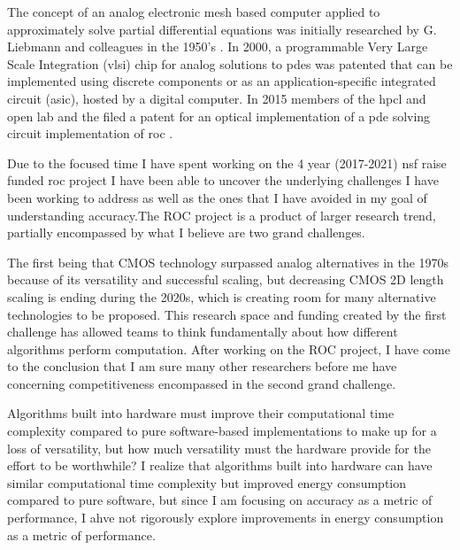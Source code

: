 \par The concept of an analog electronic mesh based computer applied to approximately solve partial differential equations was initially researched by G. Liebmann and colleagues in the 1950's \cite{G.Liebmann_1950, liebmann1954resistance}. In 2000, a programmable \gls{Very Large Scale Integration} (\acrshort{vlsi}) chip for analog solutions to \acrshort{pde}s was patented \cite{ramirez2000digitally} that can be implemented using discrete components or as an \gls{application-specific integrated circuit} (\acrshort{asic}), hosted by a digital computer. In 2015 members of the \acrfull{hpcl} and \acrfull{open} lab and the filed a patent for an optical implementation of a \acrshort{pde} solving circuit implementation of \acrfull{roc} \cite{patent_20170161417}.

\par Due to the focused time I have spent working on the 4 year (2017-2021) \acrfull{nsf} \acrfull{raise} funded \acrshort{roc} project I have been able to uncover the underlying challenges I have been working to address as well as the ones that I have avoided in my goal of understanding accuracy.The ROC project is a product of larger research trend, partially encompassed by what I believe are two grand challenges. 

\par The first being that CMOS technology surpassed analog alternatives in the 1970s because of its versatility and successful scaling, but decreasing CMOS 2D length scaling is ending during the 2020s, which is creating room for many alternative technologies to be proposed. This research space and funding created by the first challenge has allowed teams to think fundamentally about how different algorithms perform computation. After working on the ROC project, I have come to the conclusion that I am sure many other researchers before me have concerning competitiveness encompassed in the second grand challenge. 

\par Algorithms built into hardware must improve their computational time complexity compared to pure software-based implementations to make up for a loss of versatility, but how much versatility must the hardware provide for the effort to be worthwhile? I realize that algorithms built into hardware can have similar computational time complexity but improved energy consumption compared to pure software, but since I am focusing on accuracy as a metric of performance, I ahve not rigorously explore improvements in energy consumption as a metric of performance.
